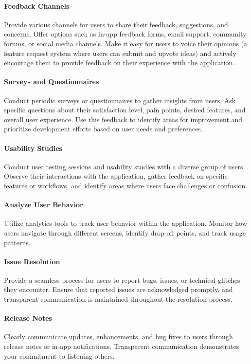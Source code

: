 \paragraph{Feedback Channels}
Provide various channels for users to share their feedback, suggestions, and concerns. Offer options such as in-app 
feedback forms, email support, community forums, or social media channels. Make it easy for users to voice their 
opinions (a feature request system where users can submit and upvote ideas) and actively encourage them to provide 
feedback on their experience with the application.

\paragraph{Surveys and Questionnaires}
Conduct periodic surveys or questionnaires to gather insights from users. Ask specific questions about their 
satisfaction level, pain points, desired features, and overall user experience. Use this feedback to identify 
areas for improvement and prioritize development efforts based on user needs and preferences.

\paragraph{Usability Studies}
Conduct user testing sessions and usability studies with a diverse group of users. Observe their interactions with 
the application, gather feedback on specific features or workflows, and identify areas where users face challenges 
or confusion.

\paragraph{Analyze User Behavior}
Utilize analytics tools to track user behavior within the application. Monitor how users navigate through different 
screens, identify drop-off points, and track usage patterns.

\paragraph{Issue Resolution}
Provide a seamless process for users to report bugs, issues, or technical glitches they encounter. Ensure that 
reported issues are acknowledged promptly, and transparent communication is maintained throughout the resolution 
process.

\paragraph{Release Notes}
Clearly communicate updates, enhancements, and bug fixes to users through release notes or in-app notifications. 
Transparent communication demonstrates your commitment to listening others.

